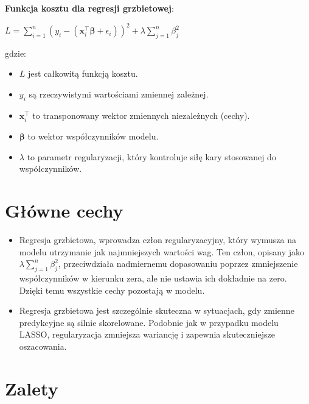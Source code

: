     \textbf{Funkcja kosztu dla regresji grzbietowej}: 
    \begin{center}
        $L = \sum_{i=1}^{n} (y_i - (\boldsymbol{x}_i^{\top} \boldsymbol{\beta} + \epsilon_i))^2 + \lambda \sum_{j=1}^{n} \beta_j^2$
    \end{center}

gdzie:
\begin{itemize}
\setlength\itemsep{-0.5em}
 \item  $L$ jest całkowitą funkcją kosztu.
 \item  $y_i$ są rzeczywistymi wartościami zmiennej zależnej.

 \item  $\boldsymbol{x}_i^{\top}$ to transponowany wektor zmiennych niezależnych (cechy).

 \item  $\boldsymbol{\beta}$ to wektor współczynników modelu.

 \item  $\lambda$ to parametr regularyzacji, który kontroluje siłę kary stosowanej do współczynników.
\end{itemize}
\item 

{}
\section*{Główne cechy}
\vspace{-1.0em}
\label{sec:why_use_ml}


\begin{itemize}
\item Regresja grzbietowa, wprowadza człon regularyzacyjny, który wymusza na modelu utrzymanie jak najmniejszych wartości wag. Ten człon, opisany jako $\lambda \sum_{j=1}^{n} \beta_j^2$, przeciwdziała nadmiernemu dopasowaniu poprzez zmniejszenie współczynników w kierunku zera, ale nie ustawia ich dokładnie na zero. Dzięki temu wszystkie cechy pozostają w modelu.

\item Regresja grzbietowa jest szczególnie skuteczna w sytuacjach, gdy zmienne predykcyjne są silnie skorelowane. Podobnie jak w przypadku modelu LASSO, regularyzacja zmniejsza wariancję i zapewnia skuteczniejsze oszacowania.
\end{itemize}

{}
\section*{Zalety}
\vspace{-1.0em}
\label{sec:ml_challenges}


